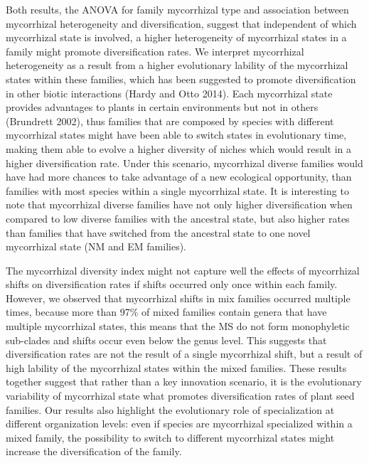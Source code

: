 \documentclass[
  12pt,
]{article}
\begin{document}
Both results, the ANOVA for family mycorrhizal type and association
between mycorrhizal heterogeneity and diversification, suggest that
independent of which mycorrhizal state is involved, a higher
heterogeneity of mycorrhizal states in a family might promote
diversification rates. We interpret mycorrhizal heterogeneity as a
result from a higher evolutionary lability of the mycorrhizal states
within these families, which has been suggested to promote
diversification in other biotic interactions (Hardy and Otto 2014). Each
mycorrhizal state provides advantages to plants in certain environments
but not in others (Brundrett 2002), thus families that are composed by
species with different mycorrhizal states might have been able to switch
states in evolutionary time, making them able to evolve a higher
diversity of niches which would result in a higher diversification rate.
Under this scenario, mycorrhizal diverse families would have had more
chances to take advantage of a new ecological opportunity, than families
with most species within a single mycorrhizal state. It is interesting
to note that mycorrhizal diverse families have not only higher
diversification when compared to low diverse families with the ancestral
state, but also higher rates than families that have switched from the
ancestral state to one novel mycorrhizal state (NM and EM families).

The mycorrhizal diversity index might not capture well the effects of
mycorrhizal shifts on diversification rates if shifts occurred only once
within each family. However, we observed that mycorrhizal shifts in mix
families occurred multiple times, because more than 97\% of mixed
families contain genera that have multiple mycorrhizal states, this
means that the MS do not form monophyletic sub-clades and shifts occur
even below the genus level. This suggests that diversification rates are
not the result of a single mycorrhizal shift, but a result of high
lability of the mycorrhizal states within the mixed families. These
results together suggest that rather than a key innovation scenario, it
is the evolutionary variability of mycorrhizal state what promotes
diversification rates of plant seed families. Our results also highlight
the evolutionary role of specialization at different organization
levels: even if species are mycorrhizal specialized within a mixed
family, the possibility to switch to different mycorrhizal states might
increase the diversification of the family.
\end{document}
